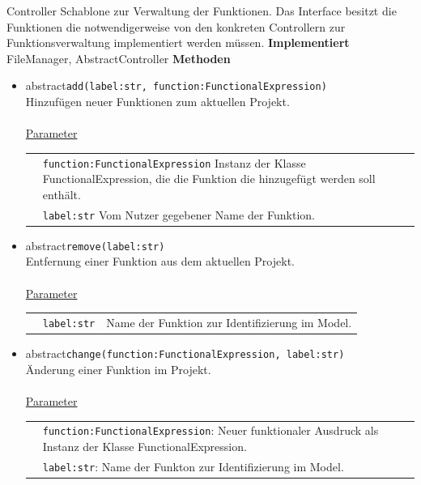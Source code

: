 \documentclass{article}
\begin{document}
Controller Schablone zur Verwaltung der Funktionen. Das Interface besitzt die Funktionen die notwendigerweise von den konkreten Controllern zur Funktionsverwaltung implementiert werden müssen.
\newline\newline
\textbf{\large{Implementiert}} FileManager, AbstractController
\newline\newline
\textbf{\large{Methoden}}
\begin{itemize}
\item \flqq{}abstract\frqq \texttt{add(label:str, function:FunctionalExpression)}\\ Hinzufügen neuer Funktionen zum aktuellen Projekt.\\\\
\underline{{Parameter}}\\
\begin{tabular}{lp{10.7cm}}
 & \texttt{function:FunctionalExpression}  Instanz der Klasse FunctionalExpression, die die Funktion die hinzugefügt werden soll enthält. \\
  & \texttt{label:str} Vom Nutzer gegebener Name der Funktion. \\
\end{tabular}
\item \flqq{}abstract\frqq \texttt{remove(label:str)}\\ Entfernung einer Funktion aus dem aktuellen Projekt. \\\\
\underline{{Parameter}}\\
\begin{tabular}{lll}
 & \texttt{label:str} & Name der Funktion zur Identifizierung im Model. \\
\end{tabular}
\item \flqq{}abstract\frqq \texttt{change(function:FunctionalExpression, label:str)}\\ Änderung einer Funktion im Projekt.\\\\
\underline{{Parameter}}\\
\begin{tabular}{lp{10.7cm}}
 & \texttt{function:FunctionalExpression}:  Neuer funktionaler Ausdruck als Instanz der Klasse FunctionalExpression.\\
 & \texttt{label:str}:  Name der Funkton zur Identifizierung im Model. \\
\end{tabular}

\end{itemize}
\end{document}
